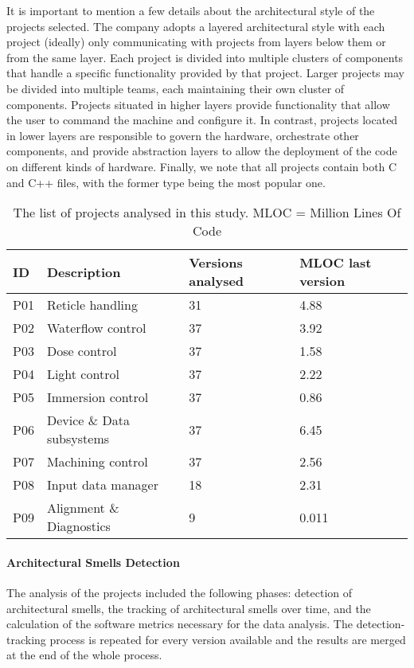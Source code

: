 It is important to mention a few details about the architectural style of the projects selected. 
The company adopts a layered architectural style with each project (ideally) only communicating with projects from layers below them or from the same layer.
Each project is divided into multiple clusters of components that handle a specific functionality provided by that project. Larger projects may be divided into multiple teams, each maintaining their own cluster of components.
Projects situated in higher layers provide functionality that allow the user to command the machine and configure it.
In contrast, projects located in lower layers are responsible to govern the hardware, orchestrate other components, and provide abstraction layers to allow the deployment of the code on different kinds of hardware.
Finally, we note that all projects contain both C and C++ files, with the former type being the most popular one. 

\begin{table}[tbp]
   \footnotesize
    \centering
    \caption{The list of projects analysed in this study. MLOC = Million Lines Of Code}
    \label{c4:tab:projects}
    \begin{tabular}{@{}llll@{}}
    \toprule
    \textbf{ID} & \textbf{Description} & \textbf{Versions analysed} & \textbf{MLOC last version} \\ \midrule
    P01  & Reticle handling     & 31        & 4.88         \\ %
    P02  & Waterflow control    & 37        & 3.92         \\ %
    P03  & Dose control         & 37        & 1.58         \\ %
    P04  & Light control        & 37        & 2.22         \\ %
    P05  & Immersion control    & 37        & 0.86         \\ %
    P06  & Device \& Data subsystems & 37    & 6.45         \\ %
    P07  & Machining control    & 37        & 2.56         \\ %
    P08  & Input data manager   & 18        & 2.31         \\ %
    P09  & Alignment \& Diagnostics & 9     & 0.011      \\ %
    \bottomrule
    \end{tabular}
\end{table}

\paragraph{Architectural Smells Detection}
The analysis of the projects included the following phases: detection of architectural smells, the tracking of architectural smells over time, and the calculation of the software metrics necessary for the data analysis. 
The detection-tracking process is repeated for every version available and the results are merged at the end of the whole process.

